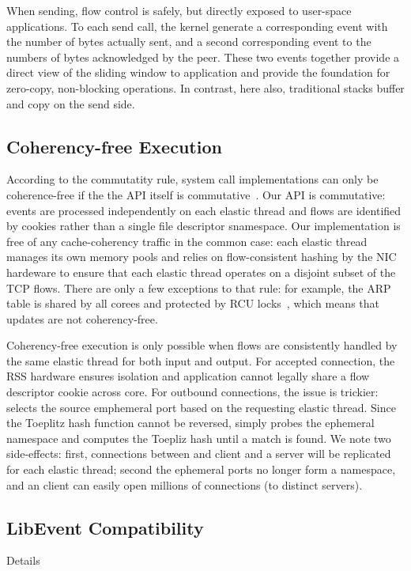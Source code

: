 When sending, flow control is safely, but directly exposed to
user-space applications.  To each send call, the \ix kernel generate a
corresponding event with the number of bytes actually sent, and a
second corresponding event to the numbers of bytes acknowledged by
the peer.  These two events together provide a direct view of the
sliding window to application and provide the foundation for zero-copy,
non-blocking operations.  In contrast, here also, traditional stacks
buffer and copy on the send side.

\subsection{Coherency-free Execution}
\label{sec:impl:cohfree}

According to the commutatity rule, system call implementations can
only be coherence-free if the the API itself is
commutative~\cite{DBLP:conf/sosp/ClementsKZMK13}.  Our API is
commutative: events are processed independently on each elastic thread
and flows are identified by cookies rather than a single file
descriptor snamespace.  Our implementation is free of any
cache-coherency traffic in the common case: each elastic thread
manages its own memory pools and \ix relies on flow-consistent hashing
by the NIC hardeware to ensure that each elastic thread operates on a
disjoint subset of the TCP flows.  There are only a few exceptions to
that rule: for example, the ARP table is shared by all corees and
protected by RCU locks~\cite{mckenney1998read}, which means that
updates are not coherency-free.

Coherency-free execution is only possible when flows are consistently
handled by the same elastic thread for both input and output.  For
accepted connection, the RSS hardware ensures isolation and
application cannot legally share a flow descriptor cookie across core.
For outbound connections, the issue is trickier: \ix selects the
source emphemeral port based on the requesting elastic thread. Since
the Toeplitz hash function cannot be reversed, \ix simply probes the
ephemeral namespace and computes the Toepliz hash until a match is
found.  We note two side-effects: first, connections between and \ix
client and a server will be replicated for each elastic thread; second
the ephemeral ports no longer form a namespace, and an \ix client can
easily open millions of connections (to distinct servers).





\subsection{LibEvent Compatibility}
\label{sec:impl:libix}
\todo Details 

